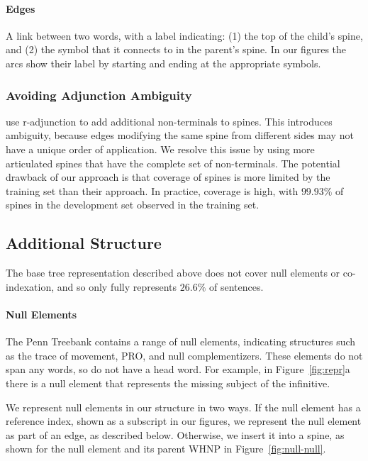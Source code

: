 \paragraph{Edges}
A link between two words, with a label indicating: (1) the top of the child's spine, and (2) the symbol that it connects to in the parent's spine.
In our figures the arcs show their label by starting and ending at the appropriate symbols.

\subsubsection{Avoiding Adjunction Ambiguity}

\textcite{cck} use r-adjunction to add additional non-terminals to spines.
This introduces ambiguity, because edges modifying the same spine from different sides may not have a unique order of application.
We resolve this issue by using more articulated spines that have the complete set of non-terminals.
The potential drawback of our approach is that coverage of spines is more limited by the training set than their approach.
In practice, coverage is high, with $99.93\%$ of spines in the development set observed in the training set.

\subsection{Additional Structure}

The base tree representation described above does not cover null elements or co-indexation, and so only fully represents $26.6\%$ of sentences.

\paragraph{Null Elements}
The Penn Treebank contains a range of null elements, indicating structures such as the trace of movement, PRO, and null complementizers.
These elements do not span any words, so do not have a head word.
For example, in Figure~\ref{fig:repr}a there is a null element that represents the missing subject of the infinitive.

We represent null elements in our structure in two ways.
If the null element has a reference index, shown as a subscript in our figures, we represent the null element as part of an edge, as described below.
Otherwise, we insert it into a spine, as shown for the null element and its parent WHNP in Figure~\ref{fig:null-null}.

